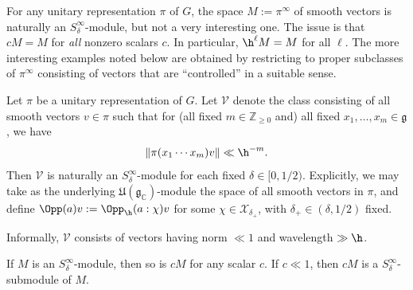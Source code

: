 \begin{example}
  For any unitary representation $\pi$ of $G$, the space $M := \pi^\infty$ of smooth vectors is naturally an $S_\delta^\infty$-module, but not a very interesting one.  The issue is that $c M = M$ for \emph{all} nonzero scalars $c$.  In particular, $\h^\ell M = M$ for all $\ell$.  The more interesting examples noted below are obtained by restricting to proper subclasses of $\pi^{\infty}$ consisting of vectors that are ``controlled'' in a suitable sense.
\end{example}

\begin{example}\label{example:class-V-wavelength-h}
  Let $\pi$ be a unitary representation of $G$.  Let $\mathcal{V}$  denote the class consisting of all smooth vectors $v \in \pi$ such that for (all fixed $m \in \mathbb{Z}_{\geq 0}$  and) all fixed $x_1,\dotsc,x_m \in \mathfrak{g}$, we have
  \[
    \|\pi(x_1 \dotsb x_m) v\| \ll \h^{-m}.
  \]
  Then $\mathcal{V}$ is naturally an $S^\infty_\delta$-module for each fixed $\delta \in [0,1/2)$.  Explicitly, we may take as the underlying $\mathfrak{U}(\mathfrak{g}_\mathbb{C})$-module the space of all smooth vectors in $\pi$, and define $\Opp(a) v := \Opp_{\h}(a:\chi) v$ for some $\chi \in \mathcal{X}_{\delta_+}$, with $\delta_+ \in (\delta, 1/2)$ fixed.

  Informally, $\mathcal{V}$ consists of vectors having norm $\ll 1$ and wavelength $\gg \h$.
\end{example}

\begin{example}
  If $M$ is an $S_\delta^\infty$-module, then so is $c M$ for any scalar $c$.  If $c \ll 1$, then $c M$ is a $S_\delta^\infty$-submodule of $M$.
\end{example}

